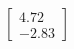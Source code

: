 \documentclass[preview]{standalone}
\begin{document}
\begin{align*}
\begin{bmatrix} 4.72 \\ -2.83 \end{bmatrix}
\end{align*}
\end{document}
